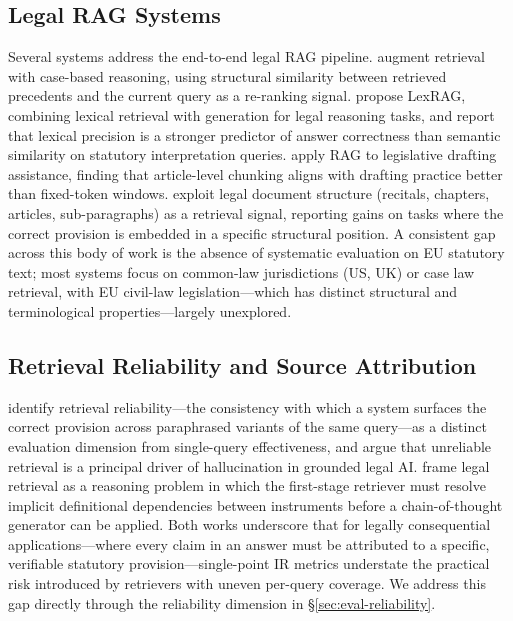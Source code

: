 \documentclass{iosart2x}
\begin{document}
\subsection{Legal RAG Systems}
\label{sec:related-legalrag}

Several systems address the end-to-end legal RAG pipeline.
\citet{cbrrag2023} augment retrieval with case-based reasoning,
using structural similarity between retrieved precedents and the
current query as a re-ranking signal.  \citet{lexrag2024} propose
LexRAG, combining lexical retrieval with generation for legal
reasoning tasks, and report that lexical precision is a stronger
predictor of answer correctness than semantic similarity on statutory
interpretation queries.  \citet{lexdrafter2024} apply RAG to
legislative drafting assistance, finding that article-level chunking
aligns with drafting practice better than fixed-token windows.
\citet{legalstructurerag2024} exploit legal document structure
(recitals, chapters, articles, sub-paragraphs) as a retrieval signal,
reporting gains on tasks where the correct provision is embedded
in a specific structural position.  A consistent gap across this
body of work is the absence of systematic evaluation on EU statutory
text; most systems focus on common-law jurisdictions (US, UK)
or case law retrieval, with EU civil-law legislation---which has
distinct structural and terminological properties---largely
unexplored.

\subsection{Retrieval Reliability and Source Attribution}
\label{sec:related-reliability}

\citet{reliableretrievallegal2024} identify retrieval reliability---the
consistency with which a system surfaces the correct provision across
paraphrased variants of the same query---as a distinct evaluation
dimension from single-query effectiveness, and argue that unreliable
retrieval is a principal driver of hallucination in grounded legal AI.
\citet{reasoninglegal2024} frame legal retrieval as a reasoning
problem in which the first-stage retriever must resolve implicit
definitional dependencies between instruments before a chain-of-thought
generator can be applied.  Both works underscore that for legally
consequential applications---where every claim in an answer must be
attributed to a specific, verifiable statutory provision---single-point
IR metrics understate the practical risk introduced by retrievers with
uneven per-query coverage.  We address this gap directly through the
reliability dimension in \S\ref{sec:eval-reliability}.
\end{document}

